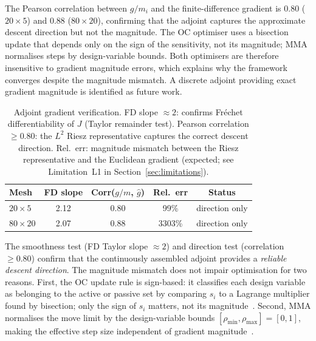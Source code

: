 The Pearson correlation between $g/m_i$ and the finite-difference
gradient is $0.80$ ($20\times5$) and $0.88$ ($80\times20$),
confirming that the adjoint captures the approximate descent direction
but not the magnitude.
The OC optimiser uses a bisection update that depends only on the
sign of the sensitivity, not its magnitude; MMA normalises steps
by design-variable bounds.
Both optimisers are therefore insensitive to gradient magnitude
errors, which explains why the framework converges despite
the magnitude mismatch.
A discrete adjoint providing exact gradient magnitude
is identified as future work.

\begin{table}[h]
\centering
\caption{Adjoint gradient verification.
         FD slope $\approx 2$: confirms Fr\'{e}chet differentiability
         of $J$ (Taylor remainder test).
         Pearson correlation $\geq 0.80$: the $L^2$ Riesz
         representative captures the correct descent direction.
         Rel.~err: magnitude mismatch between the Riesz
         representative and the Euclidean gradient
         (expected; see Limitation~L1 in Section~\ref{sec:limitations}).}
\label{tab:adjoint_verif}
\begin{tabular}{@{}lcccc@{}}
\toprule
Mesh & FD slope & Corr($g/m$, $\hat{g}$) & Rel.~err & Status \\
\midrule
$20\times5$   & 2.12 & 0.80 & 99\%   & direction only \\
$80\times20$  & 2.07 & 0.88 & 3303\% & direction only \\
\bottomrule
\end{tabular}
\end{table}

\noindent
The smoothness test (FD Taylor slope $\approx 2$) and direction test
(correlation $\geq 0.80$) confirm that the continuously assembled
adjoint provides a \emph{reliable descent direction}.
The magnitude mismatch does not impair optimisation for two reasons.
First, the OC update rule is sign-based: it classifies each design
variable as belonging to the active or passive set by comparing
$s_i$ to a Lagrange multiplier found by bisection; only the sign
of $s_i$ matters, not its magnitude~\cite{bendsoe2003}.
Second, MMA normalises the move limit by the design-variable bounds
$[\rho_{\min},\rho_{\max}]=[0,1]$, making the effective step size
independent of gradient magnitude~\cite{svanberg1987}.


